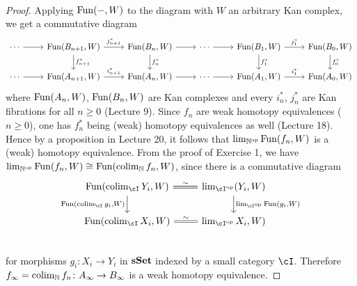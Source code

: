 \documentclass[a4paper,11pt,openany]{scrartcl}
\begin{document}
~\\
\begin{proof}
Applying $\operatorname{Fun}(-,W)$ to the diagram with $W$ an arbitrary Kan complex, we get a commutative diagram
\[
\begin{tikzcd}
\cdots\arrow[r]& \Fun(B_{n+1},W)\arrow[r,"j_{n+1}^*"]\arrow[d,"f_{n+1}^*"]& \Fun(B_n,W)\arrow[r]\arrow[d,"f_n^*"]& \cdots\arrow[r]& \Fun(B_1,W)\arrow[r,"j_1^*"]\arrow[d,"f_1^*"]& \Fun(B_0,W)\arrow[d,"f_0^*"]\\
\cdots\arrow[r]& \Fun(A_{n+1},W)\arrow[r,"i_{n+1}^*"]& \Fun(A_n,W)\arrow[r]& \cdots\arrow[r]& \Fun(A_1,W)\arrow[r,"i_1^*"]& \Fun(A_0,W)
\end{tikzcd}
\]
where $\operatorname{Fun}(A_n,W)$, $\operatorname{Fun}(B_n,W)$ are Kan complexes and every $i_n^*$, $j_n^*$ are Kan fibrations for all $n\geqslant0$ (Lecture 9). Since $f_n$ are weak homotopy equivalences ($n\geqslant0$), one has $f_n^*$ being (weak) homotopy equivalences as well (Lecture 18). Hence by a proposition in Lecture 20, it follows that $\lim_{\mathbb{N}^{\operatorname{op}}}\operatorname{Fun}(f_n,W)$ is a (weak) homotopy equivalence. From the proof of Exercise 1, we have $\lim_{\mathbb{N}^{\operatorname{op}}}\operatorname{Fun}(f_n,W)\cong\operatorname{Fun}(\operatorname{colim}_{\mathbb{N}}f_n,W)$, since there is a commutative diagram
\[
\begin{tikzcd}
\Fun(\colim_\cI Y_i,W)\arrow[r,equal,"\sim"]\arrow[d,"\Fun(\colim_\cI g_i\text{,}W)"']&\lim_{\cI^{\op}}(Y_i,W)\arrow[d,"\lim_{\cI^{\op}}\Fun(g_i\text{,}W)"]\\
\Fun(\colim_\cI X_i,W)\arrow[r,equal,"\sim"]&\lim_{\cI^{\op}}X_i,W)\\
\end{tikzcd}
\]
for morphisms $g_i\colon X_i\to Y_i$ in $\operatorname{\mathbf{sSet}}$ indexed by a small category $\cI$. Therefore $f_\infty=\operatorname{colim}_{\mathbb{N}}f_n\colon A_\infty\to B_\infty$ is a weak homotopy equivalence.
\end{proof}
\end{document}
